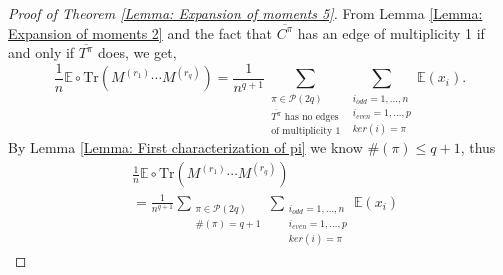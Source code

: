 \documentclass{article}
\newtheorem{lemma}      [theorem]{Lemma}
\theoremstyle{definition}
\newcommand{\E}{\mathbb{E}}
\newcommand{\cP}{\mathcal{P}}
\newcommand{\NC}{\mathcal{NC}}
\newcommand{\Tr}{\text{Tr}}
\newcommand{\I}{\mathds{1}}
\begin{document}
{%
\begin{proof}[Proof of Theorem \ref{Lemma: Expansion of moments 5}]
From Lemma \ref{Lemma: Expansion of moments 2} and the fact that $\overline{C^\pi}$ has an edge of multiplicity 1 if and only if $\overline{T^\pi}$ does, we get,
$$\frac{1}{n}\E\circ \Tr(M^{(r_1)}\cdots M^{(r_q)})=\frac{1}{n^{q+1}}\sum_{\substack{\pi\in \cP(2q)\\ \overline{T^\pi} \text{ has no edges} \\\text{of multiplicity }1}}\sum_{\substack{i_{odd}=1,\dots,n \\ i_{even}=1,\dots,p \\ ker(i)=\pi}}\E(x_i).$$
By Lemma \ref{Lemma: First characterization of pi} we know $\#(\pi)\leq q+1$, thus
\begin{align*}
&\frac{1}{n}\E\circ \Tr(M^{(r_1)}\cdots M^{(r_q)})\\
&=\frac{1}{n^{q+1}}\sum_{\substack{\pi\in \cP(2q)\\ \#(\pi)=q+1}}\sum_{\substack{i_{odd}=1,\dots,n \\ i_{even}=1,\dots,p \\ ker(i)=\pi}}\E(x_i) 

\end{align*}
\end{proof}}
\end{document}
